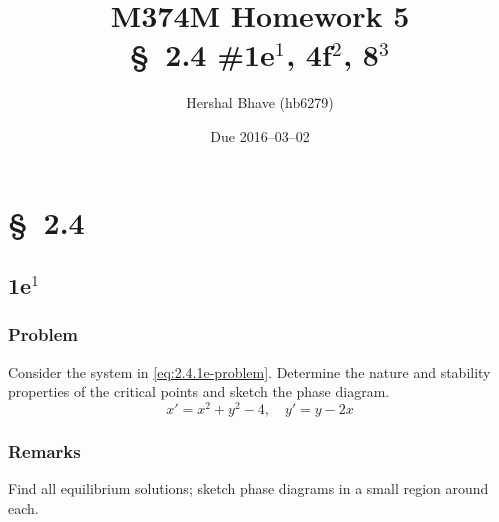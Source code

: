 \documentclass[12pt]{article}
\title{M374M Homework 5 \\
  \normalsize{\S~2.4 \#1e$^1$, 4f$^2$, 8$^3$}}
\author{Hershal Bhave (hb6279)}
\date{Due 2016--03--02}
\begin{document}
\maketitle
\section{\S~2.4}
\subsection{1e$^1$}
\subsubsection*{Problem}
Consider the system in \cref{eq:2.4.1e-problem}. Determine the nature and
stability properties of the critical points and sketch the phase diagram.
\begin{equation}
  \label{eq:2.4.1e-problem}
  x'=x^2+y^2-4,\quad y'=y-2x
\end{equation}

\subsubsection*{Remarks}
Find all equilibrium solutions; sketch phase diagrams in a small region around
each.
\end{document}

